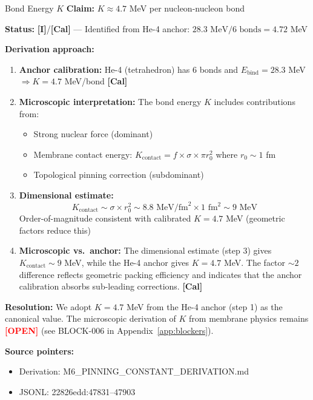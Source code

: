 \documentclass[11pt,a4paper]{article}
\newcommand{\tagI}{\textcolor{orange!80!black}{\textbf{[I]}}}
\newcommand{\tagCal}{\textcolor{purple!70!black}{\textbf{[Cal]}}}
\newcommand{\tagOPEN}{\textcolor{red}{\textbf{[OPEN]}}}
\begin{document}
\begin{capsulebox}{Bond Energy $K$}
\textbf{Claim:} $K \approx 4.7$ MeV per nucleon-nucleon bond

\textbf{Status:} \tagI{}/\tagCal{} --- Identified from He-4 anchor: $28.3 \text{ MeV} / 6 \text{ bonds} = 4.72$ MeV

\textbf{Derivation approach:}
\begin{enumerate}
    \item \textbf{Anchor calibration:} He-4 (tetrahedron) has 6 bonds and $E_{\text{bind}} = 28.3$ MeV $\Rightarrow K = 4.7$ MeV/bond \tagCal{}

    \item \textbf{Microscopic interpretation:} The bond energy $K$ includes contributions from:
    \begin{itemize}[nosep]
        \item Strong nuclear force (dominant)
        \item Membrane contact energy: $K_{\text{contact}} = f \times \sigma \times \pi r_0^2$ where $r_0 \sim 1$ fm
        \item Topological pinning correction (subdominant)
    \end{itemize}

    \item \textbf{Dimensional estimate:}
    \begin{equation}
        K_{\text{contact}} \sim \sigma \times r_0^2 \sim 8.8 \text{ MeV/fm}^2 \times 1 \text{ fm}^2 \sim 9 \text{ MeV}
    \end{equation}
    Order-of-magnitude consistent with calibrated $K = 4.7$ MeV (geometric factors reduce this)

    \item \textbf{Microscopic vs.\ anchor:} The dimensional estimate (step 3) gives $K_{\text{contact}} \sim 9$ MeV, while the He-4 anchor gives $K = 4.7$ MeV. The factor $\sim 2$ difference reflects geometric packing efficiency and indicates that the anchor calibration absorbs sub-leading corrections. \tagCal{}
\end{enumerate}

\textbf{Resolution:} We adopt $K = 4.7$ MeV from the He-4 anchor (step 1) as the canonical value. The microscopic derivation of $K$ from membrane physics remains \tagOPEN{} (see BLOCK-006 in Appendix~\ref{app:blockers}).

\textbf{Source pointers:}
\begin{itemize}[nosep]
    \item Derivation: M6\_PINNING\_CONSTANT\_DERIVATION.md
    \item JSONL: 22826edd:47831--47903
\end{itemize}
\end{capsulebox}
\end{document}
